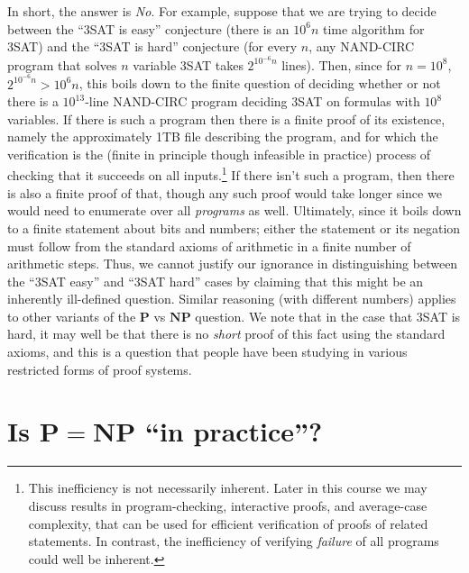 In short, the answer is \emph{No}. For example, suppose that we are
trying to decide between the ``3SAT is easy'' conjecture (there is an
\(10^6n\) time algorithm for 3SAT) and the ``3SAT is hard'' conjecture
(for every \(n\), any NAND-CIRC program that solves \(n\) variable 3SAT
takes \(2^{10^{-6}n}\) lines). Then, since for \(n = 10^8\),
\(2^{10^{-6}n} > 10^6 n\), this boils down to the finite question of
deciding whether or not there is a \(10^{13}\)-line NAND-CIRC program
deciding 3SAT on formulas with \(10^8\) variables. If there is such a
program then there is a finite proof of its existence, namely the
approximately 1TB file describing the program, and for which the
verification is the (finite in principle though infeasible in practice)
process of checking that it succeeds on all inputs.\footnote{This
  inefficiency is not necessarily inherent. Later in this course we may
  discuss results in program-checking, interactive proofs, and
  average-case complexity, that can be used for efficient verification
  of proofs of related statements. In contrast, the inefficiency of
  verifying \emph{failure} of all programs could well be inherent.} If
there isn't such a program, then there is also a finite proof of that,
though any such proof would take longer since we would need to enumerate
over all \emph{programs} as well. Ultimately, since it boils down to a
finite statement about bits and numbers; either the statement or its
negation must follow from the standard axioms of arithmetic in a finite
number of arithmetic steps. Thus, we cannot justify our ignorance in
distinguishing between the ``3SAT easy'' and ``3SAT hard'' cases by
claiming that this might be an inherently ill-defined question. Similar
reasoning (with different numbers) applies to other variants of the
\(\mathbf{P}\) vs \(\mathbf{NP}\) question. We note that in the case
that 3SAT is hard, it may well be that there is no \emph{short} proof of
this fact using the standard axioms, and this is a question that people
have been studying in various restricted forms of proof systems.

\section{Is \(\mathbf{P}=\mathbf{NP}\) ``in
practice''?}\label{Is-mathbfPmathbfNP-in-pra}


